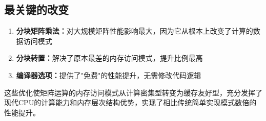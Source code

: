 \documentclass[12pt,a4paper]{article}
\begin{document}
\subsection{最关键的改变}

\begin{enumerate}
    \item \textbf{分块矩阵乘法：}对大规模矩阵性能影响最大，因为它从根本上改变了计算的数据访问模式
    \item \textbf{分块转置：}解决了原本最差的内存访问模式，提升比例最高
    \item \textbf{编译器选项：}提供了"免费"的性能提升，无需修改代码逻辑
\end{enumerate}

这些优化使矩阵运算的内存访问模式从计算密集型转变为缓存友好型，充分发挥了现代CPU的计算能力和内存层次结构优势，实现了相比传统简单实现模式数倍的性能提升。
\end{document}
